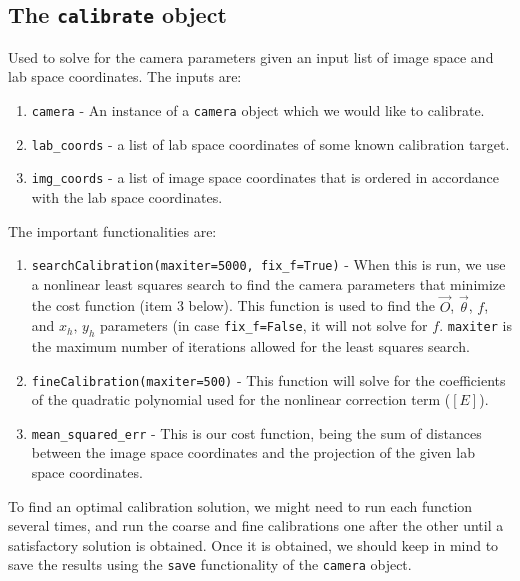\documentclass[10pt,a4paper]{article}
\begin{document}
\subsection{The \texttt{calibrate} object}\label{sec:calibrate_obj}

Used to solve for the camera parameters given an input list of image space and lab space coordinates. The inputs are:

\begin{enumerate}
	\item \texttt{camera} - An instance of a \texttt{camera} object which we would like to calibrate.
	\item \texttt{lab\_coords} - a list of lab space coordinates of some known calibration target. 
	\item \texttt{img\_coords} - a list of image space coordinates that is ordered in accordance with the lab space coordinates. 
\end{enumerate}



The important functionalities are:
%
\begin{enumerate}
	
	\item \texttt{searchCalibration(maxiter=5000, fix\_f=True)} - When this is run, we use a nonlinear least squares search to find the camera parameters that minimize the cost function (item 3 below). This function is used to find the $\vec{O}$, $\vec{\theta}$, $f$, and $x_h, \, y_h$ parameters (in case \texttt{fix\_f=False}, it will not solve for $f$. \texttt{maxiter} is the maximum number of iterations allowed for the least squares search.
	
	\item \texttt{fineCalibration(maxiter=500)} - This function will solve for the coefficients of the quadratic polynomial used for the nonlinear correction term ($[E]$). 
	
	\item \texttt{mean\_squared\_err} - This is our cost function, being the sum of distances between the image space coordinates and the projection of the given lab space coordinates.
	
\end{enumerate}
%
To find an optimal calibration solution, we might need to run each function several times, and run the coarse and fine calibrations one after the other until a satisfactory solution is obtained. Once it is obtained, we should keep in mind to save the results using the \texttt{save} functionality of the \texttt{camera} object. 
\end{document}
